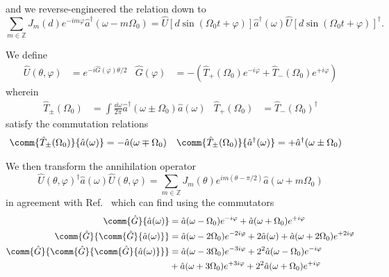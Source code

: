 and we reverse-engineered the relation down to
\begin{equation}
	\sum_{m\in\mathbb{Z}}
	J_m(d)
	e^{-im\varphi}
	\hat{a}^\dagger(\omega-m\Omega_0)
	=
	\hat{U}\left[d\sin(\Omega_0t+\varphi)\right]
	\hat{a}^\dagger(\omega)
	\hat{U}\left[d\sin(\Omega_0t+\varphi)\right]^\dagger
	.
\end{equation}

We define
\begin{align}
	\hat{U}(\theta,\varphi)
	&=
	e^{-i\hat{G}(\varphi)\theta/2}
	&
	\hat{G}(\varphi)
	&=
	-
	\left(
		\hat{T}_+(\Omega_0)
		e^{-i\varphi}
		+
		\hat{T}_-(\Omega_0)
		e^{+i\varphi}
	\right)
\end{align}
wherein
\begin{align}
	\hat{T}_\pm(\Omega_0)
	&=
	\int\frac{\dd{\omega}}{2\pi}
	\hat{a}^\dagger(\omega\pm\Omega_0)
	\hat{a}(\omega)
	&
	\hat{T}_+(\Omega_0)
	&=
	\hat{T}_-(\Omega_0)^\dagger
\end{align}
satisfy the commutation relations
\begin{align}
	\comm{\hat{T}_\pm(\Omega_0)}{\hat{a}(\omega)}
	&=
	-
	\hat{a}(\omega\mp\Omega_0)
	&
	\comm{\hat{T}_\pm(\Omega_0)}{\hat{a}^\dagger(\omega)}
	&=
	+
	\hat{a}^\dagger(\omega\pm\Omega_0)
\end{align}

We then transform the annihilation operator
\begin{equation}
	\hat{U}(\theta,\varphi)^\dagger
	\hat{a}(\omega)
	\hat{U}(\theta,\varphi)
	=
	\sum_{m\in\mathbb{Z}}
	J_m(\theta)
	e^{im(\theta-\pi/2)}
	\hat{a}(\omega+m\Omega_0)
\end{equation}
in agreement with Ref.~\cite[eq.~40]{Horoshko2018} which can find using the commutators
\begin{align}
	\comm{\hat{G}}{\hat{a}(\omega)}
	&=
	\hat{a}(\omega-\Omega_0)
	e^{-i\varphi}
	+
	\hat{a}(\omega+\Omega_0)
	e^{+i\varphi}
	\\
	\comm{\hat{G}}{\comm{\hat{G}}{\hat{a}(\omega)}}
	&=
	\hat{a}(\omega-2\Omega_0)
	e^{-2i\varphi}
	+
	2\hat{a}(\omega)
	+
	\hat{a}(\omega+2\Omega_0)
	e^{+2i\varphi}
	\\
	\comm{\hat{G}}{\comm{\hat{G}}{\comm{\hat{G}}{\hat{a}(\omega)}}}
	&=
	\hat{a}(\omega-3\Omega_0)
	e^{-3i\varphi}
	+
	2^2
	\hat{a}(\omega-\Omega_0)
	e^{-i\varphi}
	\\
	&+
	\hat{a}(\omega+3\Omega_0)
	e^{+3i\varphi}
	+
	2^2
	\hat{a}(\omega+\Omega_0)
	e^{+i\varphi}
\end{align}


